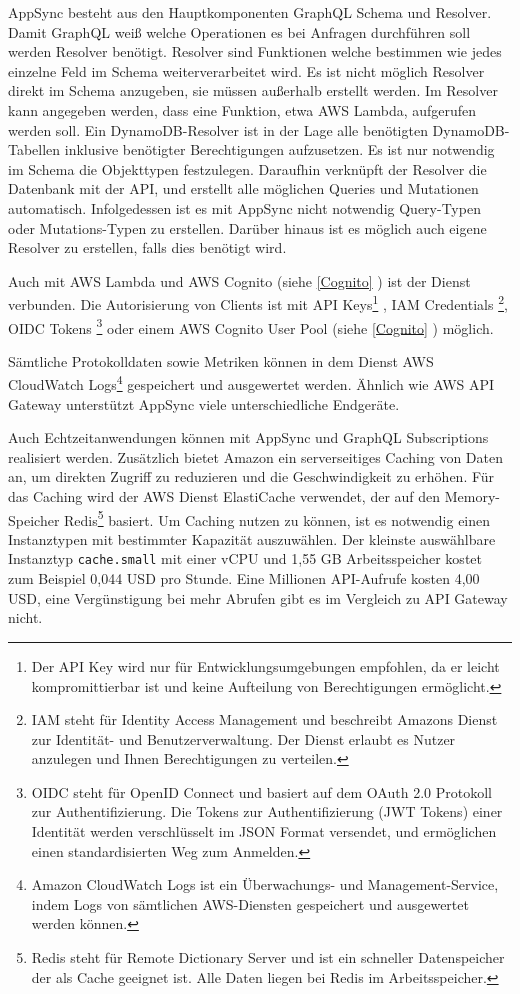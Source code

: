 AppSync besteht aus den Hauptkomponenten GraphQL Schema und Resolver.
Damit GraphQL weiß welche Operationen es bei Anfragen durchführen soll werden Resolver benötigt.
Resolver sind Funktionen welche bestimmen wie jedes einzelne Feld im Schema weiterverarbeitet wird.
Es ist nicht möglich Resolver direkt im Schema anzugeben, sie müssen außerhalb erstellt werden.
Im Resolver kann angegeben werden, dass eine Funktion, etwa AWS Lambda, aufgerufen werden soll.
Ein DynamoDB-Resolver ist in der Lage alle benötigten DynamoDB-Tabellen inklusive benötigter Berechtigungen aufzusetzen.
Es ist nur notwendig im Schema die Objekttypen festzulegen.
Daraufhin verknüpft der Resolver die Datenbank mit der API, und erstellt alle möglichen Queries und Mutationen automatisch.
Infolgedessen ist es mit AppSync nicht notwendig Query-Typen oder Mutations-Typen zu erstellen.
Darüber hinaus ist es möglich auch eigene Resolver zu erstellen, falls dies benötigt wird.

Auch mit AWS Lambda und AWS Cognito (siehe \ref{Cognito} ) ist der Dienst verbunden.
Die Autorisierung von Clients ist mit API Keys\footnote{Der API Key wird nur für Entwicklungsumgebungen empfohlen,
da er leicht kompromittierbar ist und keine Aufteilung von Berechtigungen ermöglicht.}
, IAM Credentials \footnote{
    IAM steht für Identity Access Management und beschreibt Amazons Dienst zur Identität- und Benutzerverwaltung. Der Dienst erlaubt es Nutzer anzulegen und
    Ihnen Berechtigungen zu verteilen.}, OIDC Tokens \footnote{OIDC steht für OpenID Connect und basiert auf dem OAuth 2.0 Protokoll zur Authentifizierung.
    Die Tokens zur Authentifizierung (JWT Tokens) einer Identität werden verschlüsselt im JSON Format versendet, und ermöglichen einen standardisierten Weg zum Anmelden.
          } oder einem AWS
Cognito User Pool (siehe \ref{Cognito} ) möglich. \cite[]{AppSyncAuth}

Sämtliche Protokolldaten sowie Metriken können in dem Dienst AWS CloudWatch Logs\footnote{ Amazon CloudWatch Logs ist ein Überwachungs- und Management-Service, indem Logs von sämtlichen AWS-Diensten gespeichert und ausgewertet werden können. } gespeichert und ausgewertet werden.
Ähnlich wie AWS API Gateway unterstützt AppSync viele unterschiedliche Endgeräte.

Auch Echtzeitanwendungen können mit AppSync und GraphQL Subscriptions realisiert werden.
Zusätzlich bietet Amazon ein serverseitiges Caching von Daten an, um direkten Zugriff zu reduzieren und die Geschwindigkeit zu erhöhen.
Für das Caching wird der AWS Dienst ElastiCache verwendet, der auf den Memory-Speicher Redis\footnote{Redis steht für Remote Dictionary Server und ist ein schneller Datenspeicher der als Cache geeignet ist. Alle Daten liegen bei Redis im Arbeitsspeicher.} basiert.
Um Caching nutzen zu können, ist es notwendig einen Instanztypen mit bestimmter Kapazität auszuwählen.
Der kleinste auswählbare Instanztyp \verb+cache.small+ mit einer vCPU und 1,55 GB Arbeitsspeicher kostet zum Beispiel 0,044 USD pro Stunde.
Eine Millionen API-Aufrufe kosten 4,00 USD, eine Vergünstigung bei mehr Abrufen gibt es im Vergleich zu API Gateway nicht.
\cite[]{AppSync} \cite[]{AppSyncPreise}



